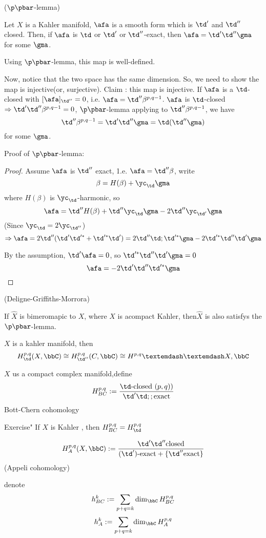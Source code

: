 \begin{lemma}($\p\pbar$-lemma)

Let $X$ is a Kahler manifold, $\afa$ is a smooth form which is 
$\td'$ and $\td''$ closed. Then, if $\afa$ is 
$\td$ or $\td'$ or $\td''$-exact, then $\afa=\td'\td''\gma$
for some $\gma$.
\end{lemma}

Using $\p\pbar$-lemma, this map is well-defined.

Now, notice that the two space has the same dimension. So, 
we need to show the map is injective(or, surjective).
Claim : this map is injective. If $\afa$ is a $\td$-closed 
with $[\afa]_{\td''}=0$, i.e. $\afa=\td''\beta^{p,q-1}$.
$\afa$ is $\td$-closed$\Rightarrow\td'\td''\beta^{p,q-1}=0$,
$\p\pbar$-lemma applying to $\td''\beta^{p,q-1}$, we have
$$\td''\beta^{p,q-1}=\td'\td''\gma=\td(\td''\gma)$$
for some $\gma$.

\vs

Proof of $\p\pbar$-lemma:

\begin{proof}
Assume $\afa$ is $\td''$ exact, 1.e. $\afa=\td''\beta$,
write 
$$\beta=H(\beta)+\yc_\td\gma$$
where $H(\beta)$ is $\yc_\td$-harmonic, so 
$$\afa=\td'' H(\beta)+\td''\yc_\td\gma-2\td''\yc_{\td'}\gma$$
(Since $\yc_\td=2\yc_{\td''}$)
$$\Rightarrow\afa=2\td''(\td'\td'^*+\td'^*\td')
=2\td''\td;\td'^*\gma-2\td'^*\td''\td'\gma$$

By the assumption, $\td'\afa=0$, so
$\td'^*\td''\td'\gma=0$
$$\afa=-2\td'\td''\td'^*\gma$$
\end{proof}

\begin{rem}(Deligne-Griffiths-Morrora)

If $\widehat{X}$ is bimeromapic to $X$, where $X$ is 
acompact Kahler, then$\hat{X}$ is also satisfys the $\p\pbar$-lemma.

$X$ is a kahler manifold, then 
$$H^{p,q}_\td(X,\bbC)\cong H^{p,q}_{\td''}(C,\bbC)\cong
H^{p,q}——{X,\bbC}$$
\end{rem}

$X$ us a compact complex manifold,define 
$$H_{BC}^{p,q}:=
\frac{\td\text{-closed $(p,q)$)}}{\td'\td;;\text{exact}}$$
Bott-Chern cohomology

Exercise" If $X$ is Kahler , then $H^{p,q}_{BC}=H^{p,q}_\td$

$$H^{p,q}_A(X,\bbC):=
\frac{\td'\td''\text{closed}}{(\td')\text{-exact}+\{\td''\text{exact}\}}$$
(Appeli cohomology)

denote 
$$h_{BC}^k:=\sum_{p+q=k}\dim_{\bbC}H_{BC}^{p,q}$$
$$h_{A}^k:=\sum_{p+q=k}\dim_{\bbC}H_{A}^{p,q}$$

